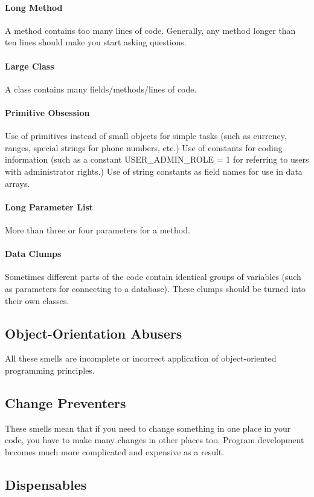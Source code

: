 \documentclass{book}
\begin{document}
\paragraph{Long Method}
A method contains too many lines of code. Generally, any method longer than ten lines should make you start asking questions.
\paragraph{Large Class}
A class contains many fields/methods/lines of code.
\paragraph{Primitive Obsession}
    Use of primitives instead of small objects for simple tasks (such as currency, ranges, special strings for phone numbers, etc.)
    Use of constants for coding information (such as a constant USER\_ADMIN\_ROLE = 1 for referring to users with administrator rights.)
    Use of string constants as field names for use in data arrays.
\paragraph{Long Parameter List}
More than three or four parameters for a method.
\paragraph{Data Clumps}
Sometimes different parts of the code contain identical groups of variables (such as parameters for connecting to a database). These clumps should be turned into their own classes.

\subsection{Object-Orientation Abusers}

All these smells are incomplete or incorrect application of object-oriented programming principles.
\subsection{Change Preventers}

These smells mean that if you need to change something in one place in your code, you have to make many changes in other places too.
Program development becomes much more complicated and expensive as a result.
\subsection{Dispensables}
\end{document}
